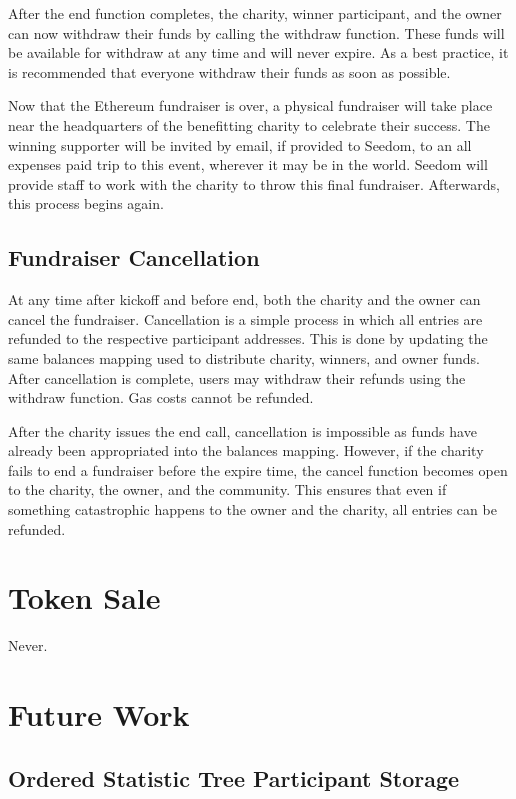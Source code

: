 \documentclass[11pt]{article}
\begin{document}
After the end function completes, the charity, winner participant, and the owner can now withdraw their funds by calling the withdraw function. These funds will be available for withdraw at any time and will never expire. As a best practice, it is recommended that everyone withdraw their funds as soon as possible.

Now that the Ethereum fundraiser is over, a physical fundraiser will take place near the headquarters of the benefitting charity to celebrate their success. The winning supporter will be invited by email, if provided to Seedom, to an all expenses paid trip to this event, wherever it may be in the world. Seedom will provide staff to work with the charity to throw this final fundraiser. Afterwards, this process begins again.

\subsection{Fundraiser Cancellation}

At any time after kickoff and before end, both the charity and the owner can cancel the fundraiser. Cancellation is a simple process in which all entries are refunded to the respective participant addresses. This is done by updating the same balances mapping used to distribute charity, winners, and owner funds. After cancellation is complete, users may withdraw their refunds using the withdraw function. Gas costs cannot be refunded.

After the charity issues the end call, cancellation is impossible as funds have already been appropriated into the balances mapping. However, if the charity fails to end a fundraiser before the expire time, the cancel function becomes open to the charity, the owner, and the community. This ensures that even if something catastrophic happens to the owner and the charity, all entries can be refunded.

\section{Token Sale}
Never.

\section{Future Work}

\subsection{Ordered Statistic Tree Participant Storage}
\end{document}
